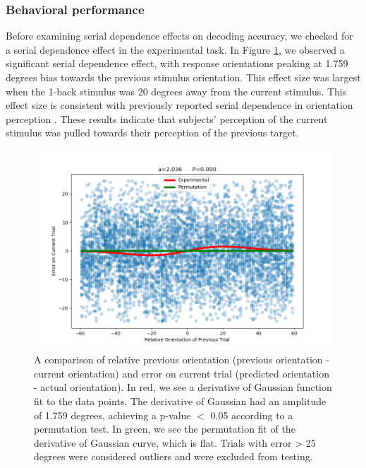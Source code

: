 \documentclass[../main.tex]{subfiles}
\begin{document}
\subsubsection{Behavioral performance}
Before examining serial dependence effects on decoding accuracy, we checked for a serial dependence effect in the experimental task. In Figure \ref{DoG}, we observed a significant serial dependence effect, with response orientations peaking at 1.759 degrees bias towards the previous stimulus orientation. This effect size was largest when the 1-back stimulus was 20 degrees away from the current stimulus. This effect size is consistent with previously reported serial dependence in orientation perception \citep{FRITSCHE2017590,Manassi}. These results indicate that subjects' perception of the current stimulus was pulled towards their perception of the previous target.

\begin{figure}
    \centering
    \includegraphics[scale=0.7]{figures/results/DoG_plot_v2.png}
    \caption{A comparison of relative previous orientation (previous orientation - current orientation) and error on current trial (predicted orientation - actual orientation). In red, we see a derivative of Gaussian function fit to the data points. The derivative of Gaussian had an amplitude of 1.759 degrees, achieving a p-value $<$ 0.05 according to a permutation test. In green, we see the permutation fit of the derivative of Gaussian curve, which is flat. Trials with error > 25 degrees were considered outliers and were excluded from testing. }
    \label{DoG}
\end{figure}
\end{document}
